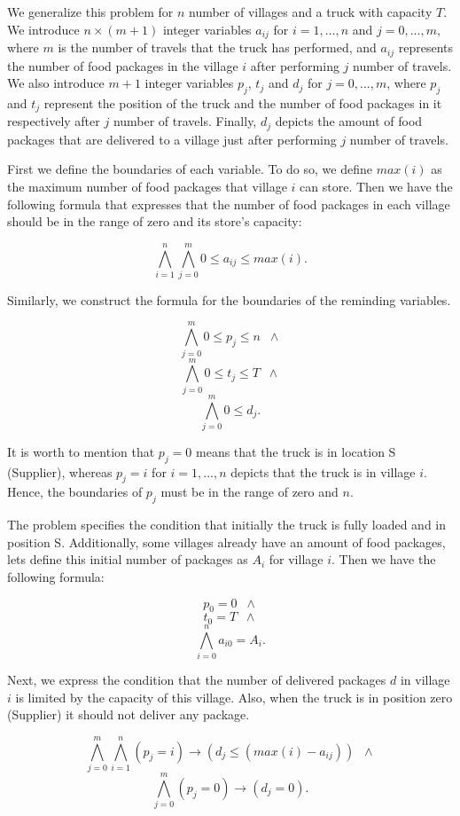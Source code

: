 We generalize this problem for $n$ number of villages and a truck with capacity $T$. We introduce $n\times (m+1)$ integer variables $a_{ij}$ for $i=1,...,n$ and $j=0,...,m$, where $m$ is the number of travels that the truck has performed, and $a_{ij}$ represents the number of food packages in the village $i$ after performing $j$ number of travels. We also introduce $m+1$ integer variables $p_j$, $t_j$ and $d_j$ for $j=0,...,m$, where $p_j$ and $t_j$ represent the position of the truck and the number of food packages in it respectively after $j$ number of travels. Finally, $d_j$ depicts the amount of food packages that are delivered to a village just after performing $j$ number of travels.

First we define the boundaries of each variable. To do so, we define $max(i)$ as the maximum number of food packages that village $i$ can store. Then we have the following formula that expresses that the number of food packages in each village should be in the range of zero and its store's capacity:

\[ \bigwedge_{i=1}^n \bigwedge_{j=0}^m 0 \leq a_{ij} \leq max(i).\]

Similarly, we construct the formula for the boundaries of the reminding variables.

\[\bigwedge_{j=0}^m 0 \leq p_j \leq n\;\;\wedge\]
\[\bigwedge_{j=0}^m 0 \leq t_j \leq T\;\;\wedge\]
\[\bigwedge_{j=0}^m 0 \leq d_j.\]

It is worth to mention that $p_j = 0$ means that the truck is in location S (Supplier), whereas $p_j = i$ for $i=1,...,n$ depicts that the truck is in village $i$. Hence, the boundaries of $p_j$ must be in the range of zero and $n$.

The problem specifies the condition that initially the truck is fully loaded and in position S. Additionally, some villages already have an amount of food packages, lets define this initial number of packages as $A_i$ for village $i$. Then we have the following formula:

\[p_0 = 0 \;\;\wedge\]
\[t_0 = T \;\;\wedge\]
\[\bigwedge_{i=0}^n a_{i0} = A_i.\]

Next, we express the condition that the number of delivered packages $d$ in village $i$ is limited by the capacity of this village. Also, when the truck is in position zero (Supplier) it should not deliver any package.

\[\bigwedge_{j=0}^m \bigwedge_{i=1}^n (p_j = i) \rightarrow (d_j \leq (max(i) - a_{ij})) \;\;\wedge\]
\[\bigwedge_{j=0}^m (p_j = 0) \rightarrow (d_j = 0) .\]

